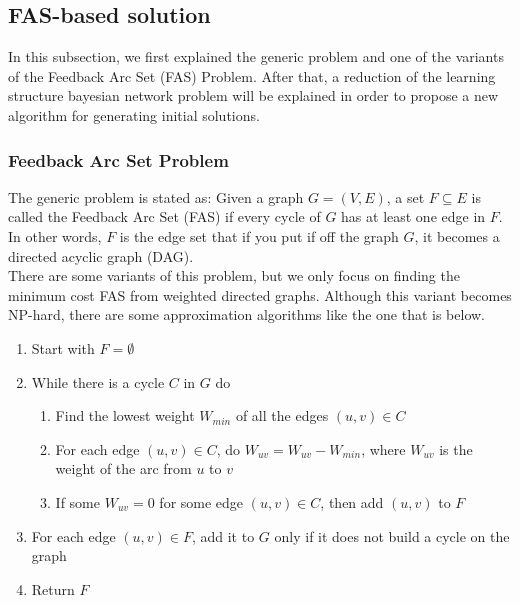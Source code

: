 \subsection{FAS-based solution}
\label{subsec:fasapproach}

In this subsection, we first explained the generic problem and one of the variants of the Feedback Arc Set (FAS) Problem. After that, a reduction of the learning structure bayesian network problem will be explained in order to propose a new algorithm for generating initial solutions.

\subsubsection{Feedback Arc Set Problem}
\label{subsub:fasp}

The generic problem is stated as: Given a graph $G = ( V , E )$, a set $F \subseteq E$ is called the Feedback Arc Set (FAS) if every cycle of $G$ has at least one edge in $F$. In other words, $F$ is the edge set that if you put if off the graph $G$, it becomes a directed acyclic graph (DAG).\\
There are some variants of this problem, but we only focus on finding the minimum cost FAS from weighted directed graphs. Although this variant becomes NP-hard, there are some approximation algorithms like the one that is below.
\begin{enumerate}
	\item Start with $F = \emptyset$
	\item While there is a cycle $C$ in $G$ do
	\begin{enumerate}
		\item Find the lowest weight $W_{min}$ of all the edges $(u,v) \in C$
		\item For each edge $(u,v) \in C$, do $W_{uv} = W_{uv} - W_{min}$, where $W_{uv}$ is the 
		weight of the arc from $u$ to $v$
		\item If some $W_{uv} = 0$ for some edge $(u,v) \in C$, then add $(u,v)$ to $F$
	\end{enumerate}
	\item For each edge $(u,v) \in F$, add it to $G$ only if it does not build a cycle on the graph
	\item Return $F$
\end{enumerate}

